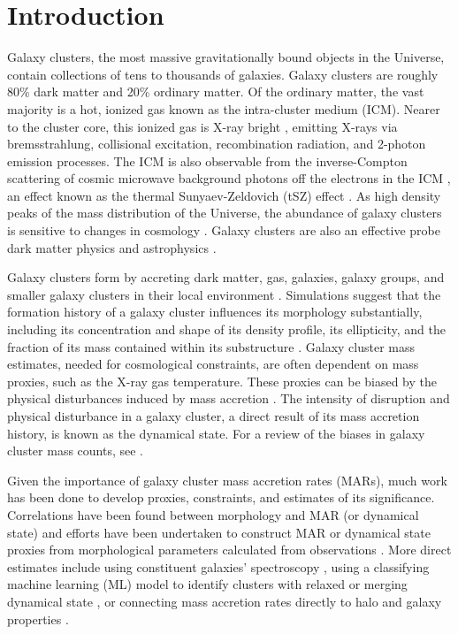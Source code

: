 \documentclass[twocolumn, linenumbers, 11pt]{aastex63}%
\begin{document}
\section{Introduction}\label{introduction}

Galaxy clusters, the most massive gravitationally bound objects in the Universe, contain collections of tens to thousands of galaxies. Galaxy clusters are roughly 80\% dark matter and 20\% ordinary matter. Of the ordinary matter, the vast majority is a hot, ionized gas known as the intra-cluster medium (ICM). Nearer to the cluster core, this ionized gas is X-ray bright \citep[e.g.,][]{Bulbul_2024}, emitting X-rays via bremsstrahlung, collisional excitation, recombination radiation, and 2-photon emission processes. The ICM is also observable from the inverse-Compton scattering of cosmic microwave background photons off the electrons in the ICM \citep[e.g.,][]{Hilton_2021}, an effect known as the thermal Sunyaev-Zeldovich (tSZ) effect \citep{SZ_1972}. As high density peaks of the mass distribution of the Universe, the abundance of galaxy clusters is sensitive to changes in cosmology \citep[e.g.,][]{eROSITA_Cluster_Abundances_2024}. Galaxy clusters are also an effective probe dark matter physics \citep[e.g.,][]{Andrade_2022} and astrophysics \citep[e.g.,][]{Fournier_2024}.

Galaxy clusters form by accreting dark matter, gas, galaxies, galaxy groups, and smaller galaxy clusters in their local environment \citep[for a review, see][]{Kravtsov_2012}. Simulations suggest that the formation history of a galaxy cluster influences its morphology substantially, including its concentration and shape of its density profile, its ellipticity, and the fraction of its mass contained within its substructure \citep[e.g.,][]{Wong_2012, Diemer_2014, Jiang_2016, Chen_2019, Lau_2021, Mendoza_2023}. Galaxy cluster mass estimates, needed for cosmological constraints, are often dependent on mass proxies, such as the X-ray gas temperature. These proxies can be biased by the physical disturbances induced by mass accretion \citep[e.g.,][]{Lau_2015, Lee_2023, Zhuravleva_2023}. The intensity of disruption and physical disturbance in a galaxy cluster, a direct result of its mass accretion history, is known as the dynamical state. For a review of the biases in galaxy cluster mass counts, see \citet{Pratt_2019}.

Given the importance of galaxy cluster mass accretion rates (MARs), much work has been done to develop proxies, constraints, and estimates of its significance. Correlations have been found between morphology and MAR (or dynamical state) \citep[e.g.,][]{Gouin_2021} and efforts have been undertaken to construct MAR or dynamical state proxies from morphological parameters calculated from observations \citep[e.g.,][]{Perez_2023}. More direct estimates include using constituent galaxies' spectroscopy \citep[e.g.,][]{Pizzardo_2023}, using a classifying machine learning (ML) model to identify clusters with relaxed or merging dynamical state \citep{Arendt_2024}, or connecting mass accretion rates directly to halo and galaxy properties \citep{Mendoza_2023}. 
\end{document}
